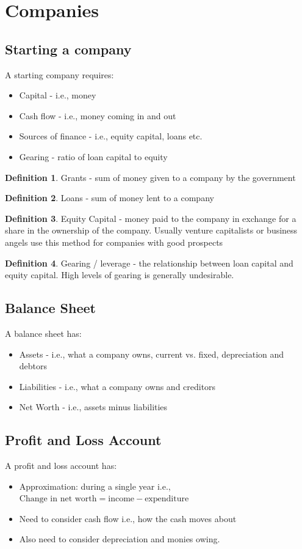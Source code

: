 \documentclass[a4paper]{article}
\theoremstyle{plain}
\theoremstyle{definition}
\newtheorem{defn}{Definition}[section]
\theoremstyle{remark}
\begin{document}
\section{Companies}
\subsection{Starting a company}
A starting company requires:
\begin{itemize}
	\item Capital - i.e., money
	\item Cash flow - i.e., money coming in and out
	\item Sources of finance - i.e., equity capital, loans etc.
	\item Gearing - ratio of loan capital to equity
\end{itemize}
\begin{defn}
	Grants - sum of money given to a company by the government
\end{defn}
\begin{defn}
	Loans - sum of money lent to a company
\end{defn}
\begin{defn}
	Equity Capital - money paid to the company in exchange for a share in the ownership of the company. Usually venture capitalists or business angels use this method for companies with good prospects
\end{defn}
\begin{defn}
	Gearing / leverage - the relationship between loan capital and equity capital. High levels of gearing is generally undesirable.
\end{defn}
\subsection{Balance Sheet}
A balance sheet has:
\begin{itemize}
	\item Assets - i.e., what a company owns, current vs. fixed, depreciation and debtors
	\item Liabilities - i.e., what a company owns and creditors
	\item Net Worth - i.e., assets minus liabilities
\end{itemize}
\subsection{Profit and Loss Account}
A profit and loss account has:
\begin{itemize}
	\item Approximation: during a single year i.e., $\text{Change in net worth}=\text{income}-\text{expenditure}$
	\item Need to consider cash flow i.e., how the cash moves about
	\item Also need to consider depreciation and monies owing.
\end{itemize}
\end{document}
